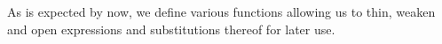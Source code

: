 As is expected by now, we define various functions allowing us to thin,
weaken and open expressions and substitutions thereof for later use.

\begin{code}%
\>[0]%
\>[9]\AgdaSymbol{:}\AgdaSpace{}%
\AgdaSpace{}%
\AgdaSymbol{(}\AgdaSpace{}%
\AgdaSpace{}%
\AgdaSymbol{)}\<%
\\
\>[0]%
\>[9]\AgdaSymbol{:}\AgdaSpace{}%
\AgdaSpace{}%
\AgdaSymbol{(}\AgdaSpace{}%
\AgdaSpace{}%
\AgdaSymbol{)}\<%
\\
\>[0]%
\>[9]\AgdaSymbol{:}\AgdaSpace{}%
\AgdaSpace{}%
\AgdaSymbol{(}\AgdaSpace{}%
\AgdaOperator{\AgdaFunction{⇒[}}\AgdaSpace{}%
\AgdaSpace{}%
\AgdaSpace{}%
\AgdaSpace{}%
\AgdaOperator{\AgdaFunction{]\AgdaUnderscore{}}}\AgdaSymbol{)}\<%
\\
\>[0]%
\>[9]\AgdaSymbol{:}\AgdaSpace{}%
\AgdaSymbol{(}\AgdaSpace{}%
\AgdaSymbol{:}\AgdaSpace{}%
\AgdaSymbol{)}\AgdaSpace{}%
\AgdaSpace{}%
\AgdaSpace{}%
\AgdaSpace{}%
\AgdaSpace{}%
\AgdaSpace{}%
\AgdaSpace{}%
\AgdaSpace{}%
\AgdaSymbol{(}\AgdaSpace{}%
\AgdaSpace{}%
\AgdaSymbol{)}\AgdaSpace{}%
\AgdaSpace{}%
\AgdaSymbol{(}\AgdaSpace{}%
\AgdaOperator{\AgdaPrimitive{+}}\AgdaSpace{}%
\AgdaSymbol{)}\<%
\end{code}

